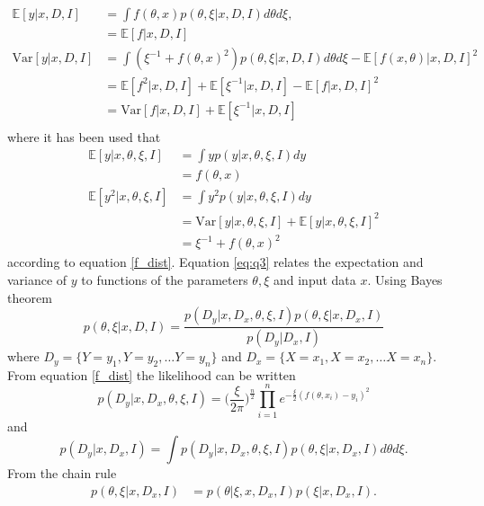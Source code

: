 \begin{equation}
	\begin{split}
		\mathbb{E}[y|x,D,I] & = \int f(\theta,x)  p(\theta,\xi|x,D,I) d\theta d\xi,\\
		& = \mathbb{E}[f|x,D,I]\\
		\text{Var}[y|x,D,I] & =
		\int (\xi^{-1}+f(\theta,x)^2) p(\theta,\xi|x,D,I)  d\theta d\xi-\mathbb{E}[f(x,\theta)|x,D,I]^2\\
		& =\mathbb{E}[f^2|x,D,I]+\mathbb{E}[\xi^{-1}|x,D,I]-\mathbb{E}[f|x,D,I]^2\\
		& = \text{Var}[f|x,D,I]+\mathbb{E}[\xi^{-1}|x,D,I]\\
	\end{split}
	\label{eq:q3}
\end{equation}	
where it has been used that
\begin{equation}
	\begin{split}
		\mathbb{E}[y|x,\theta,\xi,I] &= \int y p(y|x,\theta,\xi,I) dy\\
		&= f(\theta,x)\\
		\mathbb{E}[y^2|x,\theta,\xi,I] &= \int y^2 p(y|x,\theta,\xi,I) dy\\
		&= \text{Var}[y|x,\theta,\xi,I]+\mathbb{E}[y|x,\theta,\xi,I]^2\\
		& = \xi^{-1}+f(\theta,x)^2
	\end{split}
\end{equation}
according to equation \eqref{f_dist}. Equation \eqref{eq:q3} relates the expectation and variance of $y$ to functions of the parameters $\theta,\xi$ and input data $x$. Using Bayes theorem
\begin{equation}
	p(\theta,\xi|x,D,I) = \frac{p(D_y|x,D_x,\theta,\xi,I)p(\theta,\xi|x,D_x,I)}{p(D_y|D_x,I)}
	\label{eq:bayes2}
\end{equation}
where $D_y= \{Y=y_1, Y=y_2,\dots Y=y_n\}$ and $D_x = \{X=x_1, X=x_2,\dots X=x_n\}$. From equation \eqref{f_dist} the likelihood can be written
\begin{equation}
	p(D_y|x,D_x,\theta,\xi,I) = \bigg(\frac{\xi}{2\pi}\bigg)^\frac{n}{2}\prod_{i=1}^n e^{-\frac{\xi}{2}(f(\theta,x_i)-y_i)^2}
	\label{reg:likelihood}
\end{equation}
and
\begin{equation}
	p(D_y|x,D_x,I) = \int p(D_y|x,D_x,\theta,\xi,I)p(\theta,\xi|x,D_x,I) d\theta d\xi.
\end{equation}
From the chain rule
\begin{equation}
	\begin{split}
		p(\theta,\xi|x,D_x,I) &= p(\theta|\xi,x,D_x,I)p(\xi|x,D_x,I).
	\end{split}
\end{equation}
